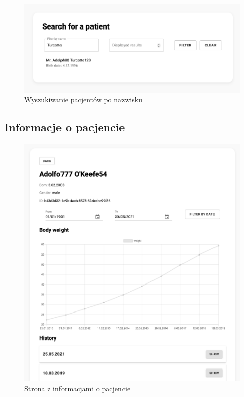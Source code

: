 \documentclass[polish,polish,a4paper]{article}
\begin{document}
	\begin{figure}[!h]
		\centering
		\includegraphics[width=.8\linewidth]{img/list2.png}
		\caption{Wyszukiwanie pacjentów po nazwisku}
	\end{figure}
	
	\subsection{Informacje o pacjencie}
	
	\begin{figure}[!h]
		\centering
		\includegraphics[width=.8\linewidth]{img/patient1.png}
		\caption{Strona z informacjami o pacjencie}
	\end{figure}
	
	\newpage
	
\end{document}
